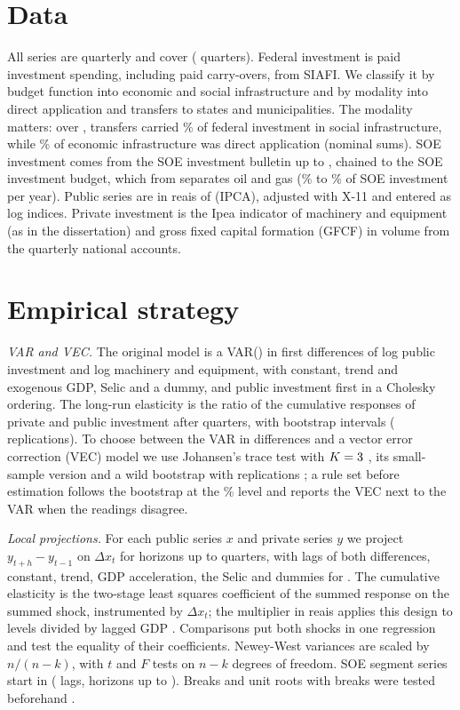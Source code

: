 \documentclass[11pt,a4paper]{article}
\begin{document}
\section{Data}

All series are quarterly and cover \SampleFull{} (\NQuarters{} quarters). Federal investment is paid investment spending, including paid carry-overs, from SIAFI. We classify it by budget function into economic and social infrastructure and by modality into direct application and transfers to states and municipalities. The modality matters: over \PerShares{}, transfers carried \ShareSocTransf\% of federal investment in social infrastructure, while \ShareEconDir\% of economic infrastructure was direct application (nominal sums). SOE investment comes from the SOE investment bulletin up to \SestBoletimEnd{}, chained to the SOE investment budget, which from \SestOIStart{} separates oil and gas (\PetroShareMin\% to \PetroShareMax\% of SOE investment per year). Public series are in reais of \BaseYear{} (IPCA), adjusted with X-11 and entered as log indices. Private investment is the Ipea indicator of machinery and equipment (as in the dissertation) and gross fixed capital formation (GFCF) in volume from the quarterly national accounts.

\section{Empirical strategy}

\textit{VAR and VEC.} The original model is a VAR(\VARp) in first differences of log public investment and log machinery and equipment, with constant, trend and exogenous GDP, Selic and a dummy, and public investment first in a Cholesky ordering. The long-run elasticity is the ratio of the cumulative responses of private and public investment after \VARh{} quarters, with bootstrap intervals (\VARruns{} replications). To choose between the VAR in differences and a vector error correction (VEC) model we use Johansen's trace test with $K = 3$ \citep{johansen1991}, its small-sample version \citep{reinsel1992} and a wild bootstrap with \JohB{} replications \citep{cavaliere2012}; a rule set before estimation follows the bootstrap at the \SigLevel\% level and reports the VEC next to the VAR when the readings disagree.

\textit{Local projections.} For each public series $x$ and private series $y$ we project $y_{t+h}-y_{t-1}$ on $\Delta x_t$ \citep{jorda2005} for horizons up to \LPhmax{} quarters, with \LPp{} lags of both differences, constant, trend, GDP acceleration, the Selic and dummies for \PulseDates{}. The cumulative elasticity is the two-stage least squares coefficient of the summed response on the summed shock, instrumented by $\Delta x_t$; the multiplier in reais applies this design to levels divided by lagged GDP \citep{ramey2018}. Comparisons put both shocks in one regression and test the equality of their coefficients. Newey-West variances are scaled by $n/(n-k)$, with $t$ and $F$ tests on $n-k$ degrees of freedom. SOE segment series start in \SestOIStart{} (\LPpShort{} lags, horizons up to \LPhmaxShort). Breaks and unit roots with breaks were tested beforehand \citep{bai1998, andrews1993, zivot1992}.
\end{document}
